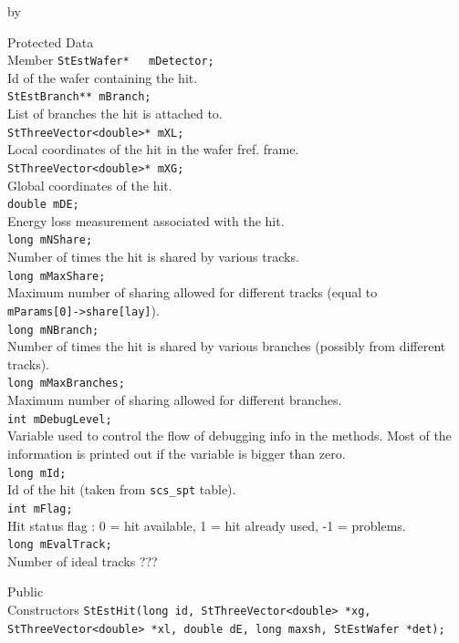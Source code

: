 \documentclass[twoside]{article}
\newcommand{\entrylabel}[1]{\mbox{\textbf{{#1}}}\hfil}%
\newenvironment{entry}
{\begin{list}{}%
    {\renewcommand{\makelabel}{\entrylabel}%
     \setlength{\labelwidth}{90pt}%
     \setlength{\leftmargin}{\labelwidth}
     \advance\leftmargin by \labelsep%
      }%
    }%
  {\end{list}}
\newcommand{\Entrylabel}[1]%
{\raisebox{0pt}[1ex][0pt]{\makebox[\labelwidth][l]%
    {\parbox[t]{\labelwidth}{\hspace{0pt}\textbf{{#1}}}}}}
\newenvironment{Entry}%
{\renewcommand{\entrylabel}{\Entrylabel}\begin{entry}}%
  {\end{entry}}
\begin{document}
\begin{Entry}
\item[Protected Data\\ Member]
	\verb+StEstWafer*   mDetector;+\\
	Id of the wafer containing the hit.\\
	\verb+StEstBranch** mBranch;+\\
	List of branches the hit is attached to.\\
	\verb+StThreeVector<double>* mXL;+\\
	Local coordinates of the hit in the wafer fref. frame.\\
	\verb+StThreeVector<double>* mXG;+\\ 
	Global coordinates of the hit.\\
	\verb+double mDE;+\\
	Energy loss measurement associated with the hit.\\
	\verb+long mNShare;+\\
	Number of times the hit is shared by various tracks.\\
	\verb+long mMaxShare;+\\
	Maximum number of sharing allowed for different tracks (equal to \\
	\verb+mParams[0]->share[lay]+).\\
	\verb+long mNBranch;+\\
	Number of times the hit is shared by various branches (possibly from different tracks).\\
	\verb+long mMaxBranches;+\\
	Maximum number of sharing allowed for different branches.\\
	\verb+int mDebugLevel;+\\ 
	Variable used to control the flow of debugging info in the methods. Most of the information is printed out if the variable is bigger than zero.\\
	\verb+long mId;+\\
	Id of the hit (taken from \verb+scs_spt+ table).\\
	\verb+int mFlag;+\\
	Hit status flag : 0 = hit available, 1 = hit already used, -1 = problems.\\
	\verb+long mEvalTrack;+\\ 
	Number of ideal tracks ???\\
\item[Public\\ Constructors]
	\verb+StEstHit(long id, StThreeVector<double> *xg, StThreeVector<double> *xl, double dE, long maxsh, StEstWafer *det);+\\

\end{Entry}
\end{document}
